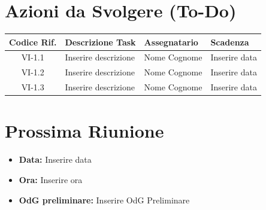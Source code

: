 \documentclass[a4paper, 11pt]{article}
\begin{document}
\section{Azioni da Svolgere (To-Do)}
\begin{tabularx}{\textwidth}{|c|X|l|l|}
\hline
\textbf{Codice Rif.} & \textbf{Descrizione Task} & \textbf{Assegnatario} & \textbf{Scadenza} \\ \hline
VI-1.1 & Inserire descrizione & Nome Cognome & Inserire data \\ \hline
VI-1.2 & Inserire descrizione & Nome Cognome & Inserire data \\ \hline
VI-1.3 & Inserire descrizione & Nome Cognome & Inserire data \\ \hline

\end{tabularx}

\section{Prossima Riunione}
\begin{itemize}
    \item \textbf{Data:} Inserire data
    \item \textbf{Ora:} Inserire ora
    \item \textbf{OdG preliminare:} Inserire OdG Preliminare
\end{itemize}
\end{document}
